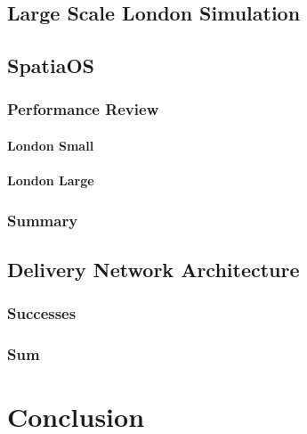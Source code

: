 \documentclass[a4paper,11pt,titlepage]{report}
\begin{document}
\section{Large Scale London Simulation}

\section{SpatiaOS}
\subsection{Performance Review}
\subsubsection{London Small}
\subsubsection{London Large}

\subsection{Summary}

\section{Delivery Network Architecture}
\subsection{Successes}
\subsection{Sum}


\newpage
\chapter{Conclusion}
\end{document}
